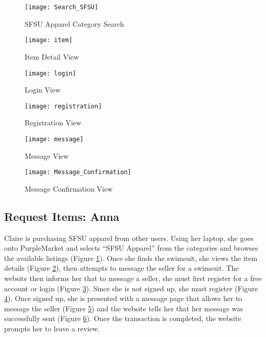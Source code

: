 \vspace{5mm}
\begin{figure}[h!]
\caption{SFSU Apparel Category Search}
\label{fig:sfsu}
\texttt{[image: Search\_SFSU]}
\end{figure}

\vspace{10mm}

\begin{figure}[h!]
\caption{Item Detail View}
\label{fig:itemc}
\texttt{[image: item]}
\end{figure}

\begin{figure}[h!]
\caption{Login View}
\label{fig:loginc}
\texttt{[image: login]}
\end{figure}

\begin{figure}[h!]
\caption{Registration View}
\label{fig:regc}
\texttt{[image: registration]}
\end{figure}

\begin{figure}[h!]
\caption{Message View}
\label{fig:msgc}
\texttt{[image: message]}
\end{figure}

\begin{figure}[h!]
\caption{Message Confirmation View}
\label{fig:msgconfc}
\texttt{[image: Message\_Confirmation]}
\end{figure}

\subsection{Request Items: Anna}
Claire is purchasing SFSU apparel from other users.  Using her laptop, she goes onto PurpleMarket and selects ``SFSU Apparel'' from the categories and browses the available listings (Figure \ref{fig:sfsu}).  Once she finds the swimsuit, she views the item details (Figure \ref{fig:itemc}), then attempts to message the seller for a swimsuit.  The website then informs her that to message a seller, she must first register for a free account or login (Figure \ref{fig:loginc}).  Since she is not signed up, she must register (Figure \ref{fig:regc}).  Once signed up, she is presented with a message page that allows her to message the seller (Figure \ref{fig:msgc}) and the website tells her that her message was successfully sent (Figure \ref{fig:msgconfc}).  Once the transaction is completed, the website prompts her to leave a review.